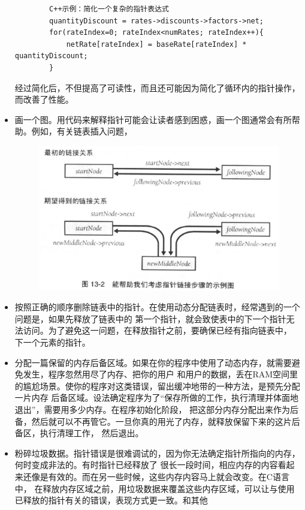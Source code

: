 \documentclass{article}
\begin{document}
\begin{itemize}
\begin{lstlisting}
        C++示例：简化一个复杂的指针表达式
        quantityDiscount = rates->discounts->factors->net;
        for(rateIndex=0; rateIndex<numRates; rateIndex++){
            netRate[rateIndex] = baseRate[rateIndex] * quantityDiscount;
        }
    \end{lstlisting}
    经过简化后，不但提高了可读性，而且还可能因为简化了循环内的指针操作，而改善了性能。
    \item 画一个图。用代码来解释指针可能会让读者感到困惑，画一个图通常会有所帮助。例如，有关链表插入问题，
    \begin{figure}[htb]
        \centering
        \includegraphics[width=15cm]{figure17.png}
    \end{figure}
    \item 按照正确的顺序删除链表中的指针。在使用动态分配链表时，经常遇到的一个问题是，如果先释放了链表中的
    第一个指针，就会致使表中的下一个指针无法访问。为了避免这一问题，在释放指针之前，要确保已经有指向链表中，
    下一个元素的指针。
    \item 分配一篇保留的内存后备区域。如果在你的程序中使用了动态内存，就需要避免发生，程序忽然用尽了内存、把你的用户
    和用户的数据，丢在RAM空间里的尴尬场景。使你的程序对这类错误，留出缓冲地带的一种方法，是预先分配一片内存
    后备区域。设法确定程序为了“保存所做的工作，执行清理并体面地退出”，需要用多少内存。在程序初始化阶段，
    把这部分内存分配出来作为后备，然后就可以不再管它。一旦你真的用光了内存，就释放保留下来的这片后备区，执行清理工作，
    然后退出。
    \item 粉碎垃圾数据。指针错误是很难调试的，因为你无法确定指针所指向的内存，何时变成非法的。有时指针已经释放了
    很长一段时间，相应内存的内容看起来还像是有效的。而在另一些时候，这些内存内容马上就会改变。在C语言中，
    在释放内存区域之前，用垃圾数据来覆盖这些内存区域，可以让与使用已释放的指针有关的错误，表现方式更一致。和其他

\end{itemize}
\end{document}
